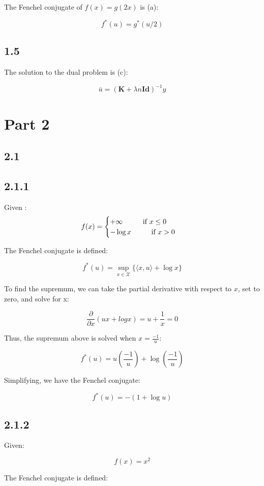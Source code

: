 \documentclass[12pt]{article}
\newcommand\tab[1][1cm]{\hspace*{#1}}
\begin{document}
The Fenchel conjugate of $f(x) = g(2x)$ is (a):

\[f^*(u) = g^*(u/2)\]

\subsection*{1.5}

The solution to the dual problem is (c):

\[\bar{u} = (\textbf{K}+\lambda n \textbf{Id})^{-1} y\]

\section*{Part 2}
\subsection*{2.1}


\subsection*{2.1.1}

Given :
\[ f(x) = \begin{cases}
      +\infty \tab \text{if } x \leq 0 \\
      -\log x \tab \text{if } x > 0 \\
   \end{cases}\]

The Fenchel conjugate is defined:

\[f^*(u) = \sup_{x\in \mathcal{X}} \{ \langle x, u\rangle +  \log x \}\]

To find the supremum, we can take the partial derivative with respect to $x$, set to zero, and solve for x:

\[\frac{\partial}{\partial x}(ux + logx) = u + \frac{1}{x} = 0\]

Thus, the supremum above is solved when $x=\frac{-1}{u}$:

\[f^*(u) = u \left(\frac{-1}{u} \right) +  \log\left(\frac{-1}{u} \right) \]

Simplifying, we have the Fenchel conjugate:

\[f^*(u) = - (1 + \log u)\]

\subsection*{2.1.2} Given:

\[f(x) = x^2\]

The Fenchel conjugate is defined:
\end{document}

